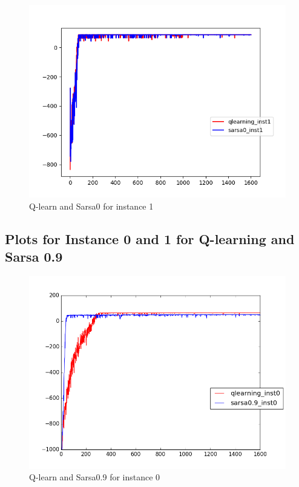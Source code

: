 \documentclass{article}
\begin{document}
\begin{figure}[H]
  \centering
  \includegraphics[scale=0.5]{images/qlearn_sarsa0_instance1}
  \caption{Q-learn and Sarsa0 for instance 1}
  \label{fig:ins1}
\end{figure}

\subsection{Plots for Instance 0 and 1 for Q-learning and Sarsa 0.9}
\begin{figure}[H]
  \centering
  \includegraphics[scale=0.5]{images/qlearn_sarsa0_9_instance_0}
  \caption{Q-learn and Sarsa0.9 for instance 0}
  \label{fig:ins0}
\end{figure}
\end{document}
